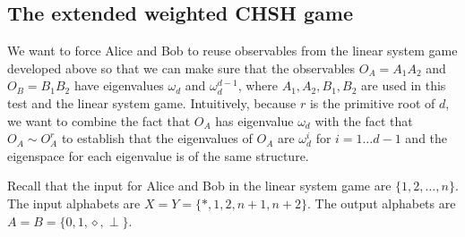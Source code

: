 \documentclass[11pt,letterpaper]{article}
\newcommand{\1}{\mathbb{1}}
\theoremstyle{definition}
\begin{document}
\subsection{The extended weighted CHSH game}
We want to force Alice and Bob to reuse observables 
from the linear system game developed above so that we can make sure that the observables 
$O_A = A_1A_2$ and $O_B =B_1B_2$ have eigenvalues $\omega_d$ and $\omega_d^{d-1}$,
where $A_1,A_2,B_1,B_2$ are used in this test and the linear system game.
Intuitively, because $r$ is the primitive root of $d$, 
we want to combine the fact that $O_A$ has eigenvalue $\omega_d$ with the fact that 
$O_A \sim O_A^r$ to establish that
the eigenvalues of $O_A$ are $\omega_d^i$ for $i =1 \dots d-1$ and the eigenspace for 
each eigenvalue is of the same structure.

Recall that the input for Alice and Bob in the linear system game are $\{1,2,\dots,n\}$.
The input alphabets are $X = Y = \{\ast, 1, 2, n+1,n+2\}$.
The output alphabets are $A = B = \{0, 1, \diamond, \perp\}$.
\end{document}

